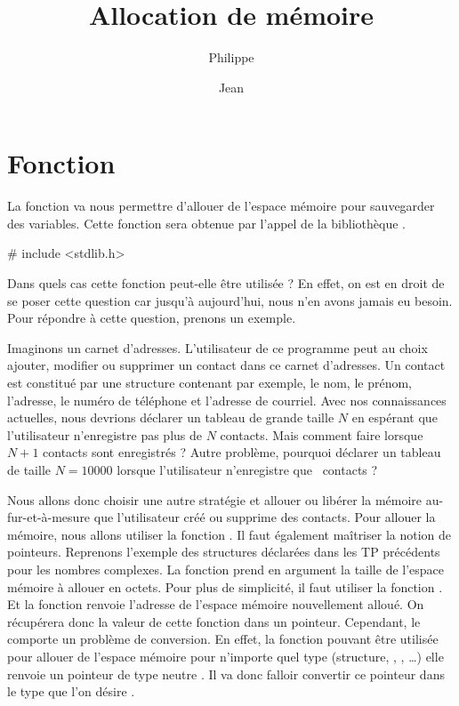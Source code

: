 \documentclass[a4paper]{article}
\title{Allocation de mémoire}
\author{Philippe \Nom {Rinaudo}\and{}Jean \Nom{Simard}}
\date{\Date[l]{03}{11}{2009}}
\begin{document}
	\maketitle
	\section{Fonction }
		La fonction  va nous permettre d'allouer de l'espace mémoire pour sauvegarder des variables.
		Cette fonction sera obtenue par l'appel de la bibliothèque .
		\begin{Code*}
# include <stdlib.h>
		\end{Code*}
		Dans quels cas cette fonction peut-elle être utilisée ?
		En effet, on est en droit de se poser cette question car jusqu'à aujourd'hui, nous n'en avons jamais eu besoin.
		Pour répondre à cette question, prenons un exemple.

		Imaginons un carnet d'adresses.
		L'utilisateur de ce programme peut au choix ajouter, modifier ou supprimer un contact dans ce carnet d'adresses.
		Un contact est constitué par une structure contenant par exemple, le nom, le prénom, l'adresse, le numéro de téléphone et l'adresse de courriel.
		Avec nos connaissances actuelles, nous devrions déclarer un tableau de grande taille $N$ en espérant que l'utilisateur n'enregistre pas plus de $N$ contacts.
		Mais comment faire lorsque $N+1$ contacts sont enregistrés ?
		Autre problème, pourquoi déclarer un tableau de taille $N=10000$ lorsque l'utilisateur n'enregistre que ~contacts ?

		Nous allons donc choisir une autre stratégie et allouer ou libérer la mémoire au-fur-et-à-mesure que l'utilisateur créé ou supprime des contacts.
		Pour allouer la mémoire, nous allons utiliser la fonction .
		Il faut également maîtriser la notion de pointeurs.
		Reprenons l'exemple des structures déclarées dans les TP précédents pour les nombres complexes.
		La fonction  prend en argument la taille de l'espace mémoire à allouer en octets.
		Pour plus de simplicité, il faut utiliser la fonction .
		Et la fonction  renvoie l'adresse de l'espace mémoire nouvellement alloué.
		On récupérera donc la valeur de cette fonction dans un pointeur.
		Cependant, le  comporte un problème de conversion.
		En effet, la fonction  pouvant être utilisée pour allouer de l'espace mémoire pour n'importe quel type (structure, , , \dots{}) elle renvoie un pointeur de type neutre .
		Il va donc falloir convertir ce pointeur dans le type que l'on désire .
		
\end{document}
